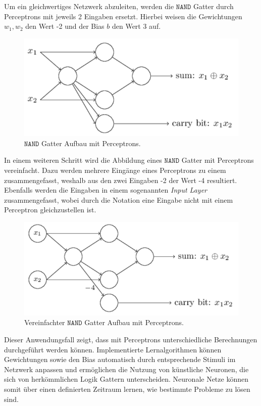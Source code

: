 \noindent
Um ein gleichwertiges Netzwerk abzuleiten, werden die $\mathtt{NAND}$ Gatter durch Perceptrons mit jeweils 2 Eingaben ersetzt. Hierbei weisen die Gewichtungen $w_1, w_2$ den Wert -2 und der Bias $b$ den Wert 3 auf. 
\begin{figure}[hbt]
	\centering
	\includegraphics[scale=0.6]{Bilder/nand_gatter_perceptron}
	\caption{$\mathtt{NAND}$ Gatter Aufbau mit Perceptrons.} 
	\label{fig:nand_gatter_perceptron} 
\end{figure}

\noindent
In einem weiteren Schritt wird die Abbildung eines $\mathtt{NAND}$ Gatter mit Perceptrons vereinfacht. Dazu werden mehrere Eingänge eines Perceptrons zu einem zusammengefasst, weshalb aus den zwei Eingaben -2 der Wert -4 resultiert. Ebenfalls werden die Eingaben in einem sogenannten \textit{Input Layer} zusammengefasst, wobei durch die Notation eine Eingabe nicht mit einem Perceptron gleichzustellen ist.
\begin{figure}[hbt]
	\centering
	\includegraphics[scale=0.6]{Bilder/nand_gatter_perceptron_simplified}
	\caption{Vereinfachter $\mathtt{NAND}$ Gatter Aufbau mit Perceptrons.} 
	\label{fig:nand_gatter_perceptron_simplified} 
\end{figure}

\noindent
Dieser Anwendungsfall zeigt, dass mit Perceptrons unterschiedliche Berechnungen durchgeführt werden können. Implementierte Lernalgorithmen können Gewichtungen sowie den Bias automatisch durch entsprechende Stimuli im Netzwerk anpassen und ermöglichen die Nutzung von künstliche Neuronen, die sich von herkömmlichen Logik Gattern unterscheiden. Neuronale Netze können somit über einen definierten Zeitraum lernen, wie bestimmte Probleme zu lösen sind. 

